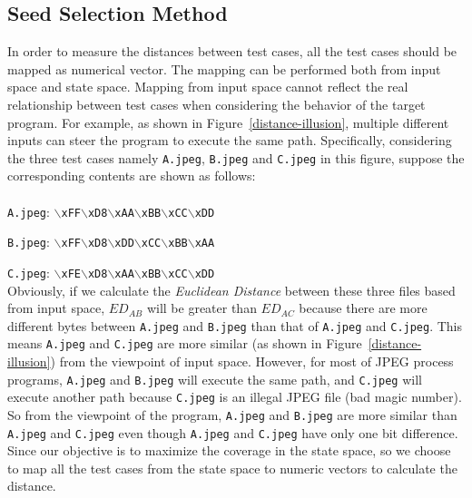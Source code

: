 \subsection{Seed Selection Method}
In order to measure the distances between test cases, all the test cases should be mapped as numerical vector. 
The mapping can be performed both from input space and state space. Mapping from input space cannot reflect the real relationship between test cases when considering the behavior of the target program. For example, as shown in Figure~\ref{distance-illusion}, multiple different inputs can steer the program to execute the same path. Specifically, considering the three test cases namely \texttt{A.jpeg}, \texttt{B.jpeg} and \texttt{C.jpeg} in this figure, suppose the corresponding contents are shown as follows:
\\
\\
\indent\texttt{A.jpeg}: \texttt{$\backslash$xFF$\backslash$xD8$\backslash$xAA$\backslash$xBB$\backslash$xCC$\backslash$xDD}

\texttt{B.jpeg}: \texttt{$\backslash$xFF$\backslash$xD8$\backslash$xDD$\backslash$xCC$\backslash$xBB$\backslash$xAA}

\texttt{C.jpeg}: \texttt{$\backslash$xFE$\backslash$xD8$\backslash$xAA$\backslash$xBB$\backslash$xCC$\backslash$xDD}
\\

\indent Obviously, if we calculate the \textit{Euclidean Distance} between these three files based from input space, $ED_{AB}$ will be greater than $ED_{AC}$ because there are more different bytes between \texttt{A.jpeg} and \texttt{B.jpeg} than that of \texttt{A.jpeg} and \texttt{C.jpeg}. This means \texttt{A.jpeg} and \texttt{C.jpeg} are more similar (as shown in Figure~\ref{distance-illusion}) from the viewpoint of input space. 
However, for most of JPEG process programs, \texttt{A.jpeg} and \texttt{B.jpeg} will execute the same path, and \texttt{C.jpeg} will execute another path because \texttt{C.jpeg} is an illegal JPEG file (bad magic number). So from the viewpoint of the program, \texttt{A.jpeg} and \texttt{B.jpeg} are more similar than \texttt{A.jpeg} and \texttt{C.jpeg} even though \texttt{A.jpeg} and \texttt{C.jpeg} have only one bit difference. 
Since our objective is to maximize the coverage in the state space, so we choose to map all the test cases from the state space to numeric vectors to calculate the distance.

